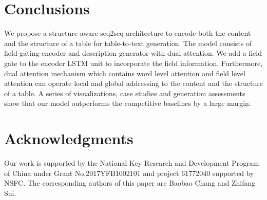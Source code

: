 \documentclass[letterpaper]{article} \usepackage{aaai18}  \usepackage{times}  \usepackage{helvet}  \usepackage{courier}  \usepackage{url}  \usepackage{graphicx}  \frenchspacing  \setlength{\pdfpagewidth}{8.5in}  \setlength{\pdfpageheight}{11in}  \usepackage{amsmath}
\begin{document}
\section{Conclusions}
We propose a structure-aware seq2seq architecture to encode both the content and the structure of a table for table-to-text generation.
The model consists of field-gating encoder and description generator with dual attention. We add a field gate to the encoder LSTM unit to incorporate the field information. 
Furthermore, dual attention mechanism which contains word level attention and field level attention can operate local and global addressing to the content and the structure of a table.
A series of visualizations, case studies and generation assessments show that our model outperforms the competitive baselines by a large margin.

\section{Acknowledgments}

Our work is supported by the National Key Research and Development Program of China under Grant No.2017YFB1002101 and project 61772040 supported by NSFC. The corresponding authors of this paper are Baobao Chang and Zhifang Sui.



\end{document}
